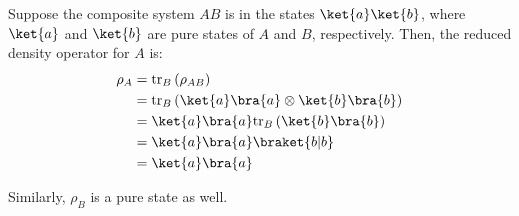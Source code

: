 \begingroup
\newcommand{\trB}[1]{\mathrm{tr}_B \left( #1 \right)}
\newcommand{\ketbra}[1]{\ket{#1} \bra{#1}}

\par Suppose the composite system $AB$ is in the states $\ket{a} \ket{b}$, where $\ket{a}$ and $\ket{b}$ are pure states of $A$ and $B$, respectively.
%
Then, the reduced density operator for $A$ is:
%
\begin{align}
\rho_A &= \trB{\rho_{AB}} \\
&= \trB{\ketbra{a} \otimes \ketbra{b}} \\
&= \ketbra{a} \trB{\ketbra{b}} \\
&= \ketbra{a} \braket{b|b} \\
&= \ketbra{a}
\end{align}
%
\par Similarly, $\rho_B$ is a pure state as well.
\endgroup
